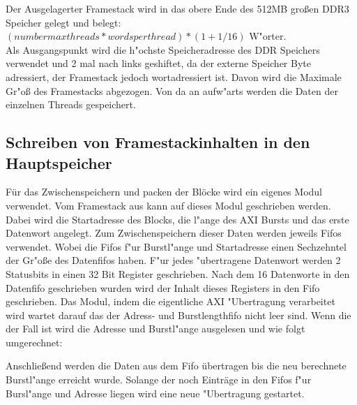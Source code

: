 Der Ausgelagerter Framestack wird in das obere Ende des 512MB großen DDR3 Speicher gelegt und belegt:\\ $(number max threads * words per thread)*(1+1/16) $ W"orter.\\
Als Ausgangspunkt wird die h"ochste Speicheradresse des DDR Speichers verwendet und 2 mal nach links geshiftet, da der externe Speicher Byte adressiert, der Framestack jedoch wortadressiert ist. Davon wird die Maximale Gr"o{\ss} des Framestacks abgezogen. Von da an aufw"arts werden die Daten der einzelnen Threads gespeichert.

\subsection{Schreiben von Framestackinhalten in den Hauptspeicher}
F\"ur das Zwischenspeichern und packen der Bl\"ocke wird ein eigenes Modul verwendet.
Vom Framestack aus kann auf dieses Modul geschrieben werden. Dabei wird die Startadresse des Blocks, die l"ange des AXI Bursts und das erste Datenwort angelegt. Zum Zwischenspeichern dieser Daten werden jeweils Fifos verwendet. Wobei die Fifos f"ur Burstl"ange und Startadresse einen Sechzehntel der Gr"o{\ss}e des Datenfifos haben. F"ur jedes "ubertragene Datenwort werden 2 Statusbits in einen 32 Bit Register geschrieben. Nach dem 16 Datenworte in den Datenfifo geschrieben wurden wird der Inhalt dieses Registers in den Fifo geschrieben. 
Das Modul, indem die eigentliche AXI "Ubertragung verarbeitet wird wartet darauf das der Adress- und Burstlengthfifo nicht leer sind. Wenn die der Fall ist wird die Adresse und Burstl"ange ausgelesen und wie folgt umgerechnet:

Anschlie{\ss}end werden die Daten aus dem Fifo \"ubertragen bis die neu berechnete Burstl"ange erreicht wurde. Solange der noch Eintr\"age in den Fifos f"ur Bursl"ange und Adresse liegen wird eine neue "Ubertragung gestartet. 

